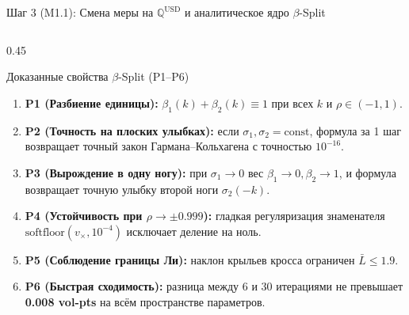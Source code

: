 \documentclass[aspectratio=169, 9pt]{beamer}
\begin{document}
\begin{frame}{Шаг 3 (M1.1): Смена меры на $\mathbb{Q}^{\text{USD}}$ и аналитическое ядро $\beta$-Split}
\begin{columns}[T]
    \begin{column}{0.45\textwidth}
      \begin{exampleblock}{Доказанные свойства $\beta$-Split (P1--P6)}
        \begin{enumerate}
          \item \textbf{P1 (Разбиение единицы):} $\beta_1(k) + \beta_2(k) \equiv 1$ при всех $k$ и $\rho \in (-1, 1)$.
          \item \textbf{P2 (Точность на плоских улыбках):} если $\sigma_1, \sigma_2 = \text{const}$, формула за 1 шаг возвращает точный закон Гармана--Кольхагена с точностью $10^{-16}$.
          \item \textbf{P3 (Вырождение в одну ногу):} при $\sigma_1 \to 0$ вес $\beta_1 \to 0, \beta_2 \to 1$, и формула возвращает точную улыбку второй ноги $\sigma_2(-k)$.
          \item \textbf{P4 (Устойчивость при $\rho \to \pm 0.999$):} гладкая регуляризация знаменателя $\text{softfloor}(v_\times, 10^{-4})$ исключает деление на ноль.
          \item \textbf{P5 (Соблюдение границы Ли):} наклон крыльев кросса ограничен $\bar{L} \le 1.9$.
          \item \textbf{P6 (Быстрая сходимость):} разница между 6 и 30 итерациями не превышает \textbf{0.008 vol-pts} на всём пространстве параметров.
        \end{enumerate}
      \end{exampleblock}
    \end{column}
  \end{columns}
\end{frame}
\end{document}
